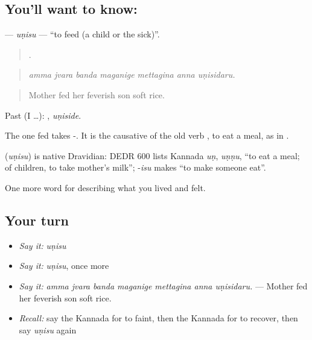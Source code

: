 \subsection*{You'll want to know: }
\textbf{} — \emph{uṇisu} — \textquotedblleft{}to feed (a child or the sick)\textquotedblright{}.

\begin{quote}
      .
\end{quote}

\begin{quote}
\emph{amma jvara banda maganige mettagina anna uṇisidaru.}
\end{quote}

\begin{quote}
Mother fed her feverish son soft rice.
\end{quote}

Past (I …): , \emph{uṇiside}.

The one fed takes -. It is the causative of the old verb , to eat a meal, as in .

\begin{cousinweb}
\textbf{} (\emph{uṇisu}) is native Dravidian: DEDR 600 lists Kannada \emph{uṇ}, \emph{uṇṇu}, \textquotedblleft{}to eat a meal; of children, to take mother's milk\textquotedblright{}; -\emph{isu} makes \textquotedblleft{}to make someone eat\textquotedblright{}.
\end{cousinweb}

\begin{grammarlens}[title={What you've built}]
One more word for describing what you lived and felt.
\end{grammarlens}

\subsection*{Your turn}
\begin{itemize}
\raggedright
  \item \emph{Say it:} \emph{uṇisu}
  \item \emph{Say it:} \emph{uṇisu}, once more
  \item \emph{Say it:} \emph{amma jvara banda maganige mettagina anna uṇisidaru.} — Mother fed her feverish son soft rice.
  \item \emph{Recall:} say the Kannada for to faint, then the Kannada for to recover, then say \emph{uṇisu} again
\end{itemize}

